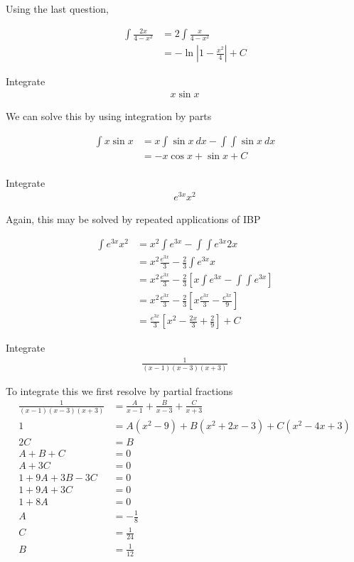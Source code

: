 \documentclass[a4paper]{article}
\begin{document}
Using the last question,

\begin{align*}
	\int \frac{2x}{4-x^2} &= 2\int \frac{x}{4-x^2} \\
		&= -\ln\left|1-\frac{x^2}{4}\right| + C
\end{align*}

\begin{question}
	Integrate
\begin{align*}
	x \sin x
\end{align*}
\end{question}

We can solve this by using integration by parts

\begin{align*}
	\int x\sin x &= x \int \sin x\ dx - \int \int \sin x\  dx \\
		&= -x\cos x + \sin x + C\\
\end{align*}

\begin{question}
	Integrate
\begin{align*}
	e^{3x}x^2
\end{align*}
\end{question}

Again, this may be solved by repeated applications of IBP

\begin{align*}
	\int e^{3x}x^2 &= x^2 \int e^{3x} - \int \int e^{3x} 2x \\
		&= x^2 \frac{e^{3x}}{3} - \frac{2}{3}\int e^{3x} x \\
		&= x^2 \frac{e^{3x}}{3} - \frac{2}{3}\left[x \int e^{3x} - \int \int e^{3x}\right] \\
		&= x^2 \frac{e^{3x}}{3} - \frac{2}{3}\left[x \frac{e^{3x}}{3} - \frac{e^{3x}}{9}\right] \\
		&= \frac{e^{3x}}{3}\left[x^2 - \frac{2x}{3} + \frac{2}{9}\right] + C
\end{align*}

\begin{question}
	Integrate
\begin{align*}
	\frac{1}{(x-1)(x-3)(x+3)}
\end{align*}
\end{question}

To integrate this we first resolve by partial fractions
\begin{align*}
	\frac{1}{(x-1)(x-3)(x+3)} &= \frac{A}{x-1} + \frac{B}{x-3} + \frac{C}{x+3} \\
	1 &= A(x^2 - 9) +B(x^2 +2x -3) +C(x^2 -4x +3) \\
	2C &= B \\
	A + B + C &= 0 \\
	A + 3C &= 0 \\
	1 + 9A +3B - 3C &= 0 \\ 
	1 + 9A +3C &= 0 \\
	1 + 8A &= 0 \\
	A &= -\frac{1}{8} \\
	C &= \frac{1}{24} \\
	B &= \frac{1}{12}
\end{align*}
\end{document}
